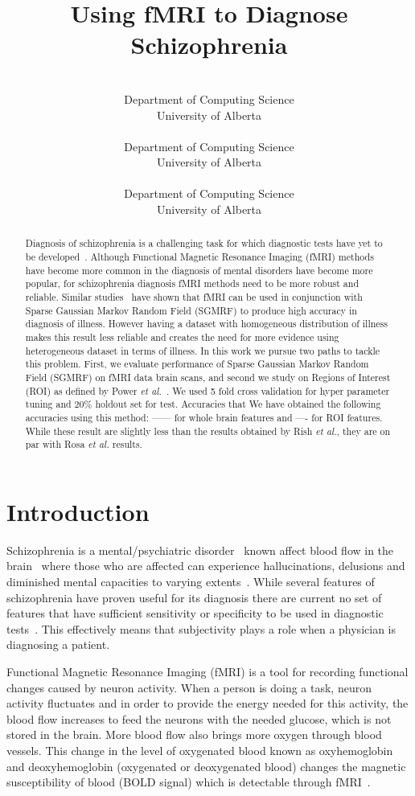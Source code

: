 \documentclass{article} %
\title{Using fMRI to Diagnose Schizophrenia}
\author{%
	\\
	Department of Computing Science\\
	University of Alberta\\
	\texttt{} 
\And 
 \\
Department of Computing Science\\
University of Alberta\\
\texttt{}
\And 
\\
Department of Computing Science\\
University of Alberta\\
\texttt{}  
}
\begin{document}
	\maketitle

\begin{abstract}
Diagnosis of schizophrenia is a challenging task for which diagnostic tests
have yet to be developed~\cite{McGuire200891}. Although Functional Magnetic 
Resonance Imaging (fMRI) methods have become more common in the diagnosis of 
mental disorders have become more popular, for schizophrenia diagnosis fMRI 
methods need to be more robust and reliable. Similar 
studies~\cite{Rish_2013}\cite{Rosa_2013} have shown that fMRI can be used in 
conjunction with Sparse Gaussian Markov Random Field (SGMRF) to produce high 
accuracy in diagnosis of illness.
However having a dataset with homogeneous distribution of illness makes this 
result less reliable and creates the need for more evidence using 
heterogeneous dataset in terms of illness. 
In this work we pursue two paths to tackle this problem. First, we evaluate 
performance of Sparse Gaussian Markov Random Field (SGMRF) on fMRI data 
brain scans, and second we study on Regions of Interest (ROI) as defined by
Power \emph{et al.}~\cite{Power_2011}. 
We used 5 fold cross validation for hyper parameter tuning and $20\%$ holdout 
set for test. Accuracies that We have obtained the following accuracies using 
this method: —— for whole brain features and —- for ROI features. While these 
result are slightly less than the results obtained by Rish \emph{et al.}, 
they are on par with Rosa \emph{et al.} results.  
\end{abstract}


\section{Introduction}
Schizophrenia is a mental/psychiatric disorder~\cite{Rish_2013, Kenji_2010} 
known affect blood flow in the brain~\cite{Kenji_2010} where those who are 
affected can experience hallucinations, delusions and diminished mental 
capacities to varying extents~\cite{jablensky2010diagnostic}. While several
features of schizophrenia have proven useful for its diagnosis there are
current no set of features that have sufficient sensitivity or specificity
to be used in diagnostic tests~\cite{jablensky2010diagnostic}. This 
effectively means that subjectivity plays a role when a physician is 
diagnosing a patient. 

Functional Magnetic Resonance Imaging (fMRI) is a tool for recording 
functional changes caused by neuron activity\cite{}. When a person is doing a 
task, neuron activity fluctuates and in order to provide the energy 
needed for this activity, the blood flow increases to feed the neurons with 
the needed glucose, which is not stored in the brain\cite{}. More blood flow also 
brings more oxygen through blood vessels. This change in the level of 
oxygenated blood known as oxyhemoglobin and deoxyhemoglobin (oxygenated or 
deoxygenated blood) changes the magnetic susceptibility of blood (BOLD signal) 
which is detectable through fMRI~\cite{}.
\end{document}
